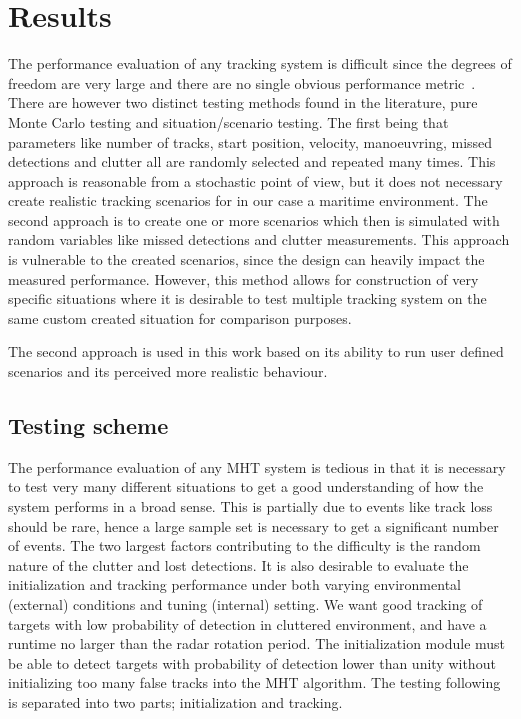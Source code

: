 \chapter{Results}\label{chapter:results}
The performance evaluation of any tracking system is difficult since the degrees of freedom are very large and there are no single obvious performance metric~\cite{Schuhmacher2008}. There are however two distinct testing methods found in the literature, pure Monte Carlo testing and situation/scenario testing. The first being that parameters like number of tracks, start position, velocity, manoeuvring, missed detections and clutter all are randomly selected and repeated many times. This approach is reasonable from a stochastic point of view, but it does not necessary create realistic tracking scenarios for in our case a maritime environment. The second approach is to create one or more scenarios which then is simulated with random variables like missed detections and clutter measurements. This approach is vulnerable to the created scenarios, since the design can heavily impact the measured performance. However, this method allows for construction of very specific situations where it is desirable to test multiple tracking system on the same custom created situation for comparison purposes.

The second approach is used in this work based on its ability to run user defined scenarios and its perceived more realistic behaviour. 

\section{Testing scheme}
The performance evaluation of any MHT system is tedious in that it is necessary to test very many different situations to get a good understanding of how the system performs in a broad sense. This is partially due to events like track loss should be rare, hence a large sample set is necessary to get a significant number of events. The two largest factors contributing to the difficulty is the random nature of the clutter and lost detections. It is also desirable to evaluate the initialization and tracking performance under both varying environmental (external) conditions and tuning (internal) setting. We want good tracking of targets with low probability of detection in cluttered environment, and have a runtime no larger than the radar rotation period. The initialization module must be able to detect targets with probability of detection lower than unity without initializing too many false tracks into the MHT algorithm. The testing following is separated into two parts; initialization and tracking.

